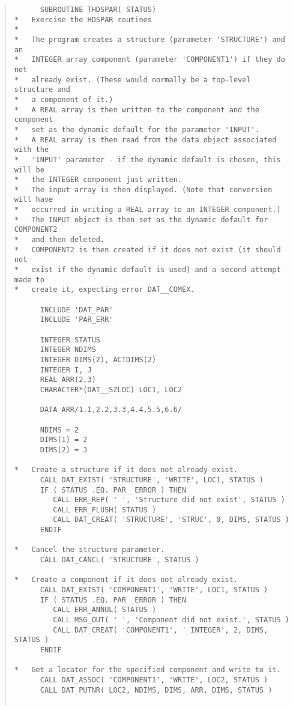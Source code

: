 \documentclass[twoside,11pt]{article}
\renewcommand{\_}{\texttt{\symbol{95}}}
\begin{document}
\begin{quote} \begin{verbatim}
      SUBROUTINE THDSPAR( STATUS)
*   Exercise the HDSPAR routines
*
*   The program creates a structure (parameter 'STRUCTURE') and an
*   INTEGER array component (parameter 'COMPONENT1') if they do not
*   already exist. (These would normally be a top-level structure and
*   a component of it.)
*   A REAL array is then written to the component and the component
*   set as the dynamic default for the parameter 'INPUT'.
*   A REAL array is then read from the data object associated with the
*   'INPUT' parameter - if the dynamic default is chosen, this will be
*   the INTEGER component just written.
*   The input array is then displayed. (Note that conversion will have
*   occurred in writing a REAL array to an INTEGER component.)
*   The INPUT object is then set as the dynamic default for COMPONENT2
*   and then deleted.
*   COMPONENT2 is then created if it does not exist (it should not
*   exist if the dynamic default is used) and a second attempt made to
*   create it, expecting error DAT__COMEX.

      INCLUDE 'DAT_PAR'
      INCLUDE 'PAR_ERR'

      INTEGER STATUS
      INTEGER NDIMS
      INTEGER DIMS(2), ACTDIMS(2)
      INTEGER I, J
      REAL ARR(2,3)
      CHARACTER*(DAT__SZLOC) LOC1, LOC2

      DATA ARR/1.1,2.2,3.3,4.4,5.5,6.6/

      NDIMS = 2
      DIMS(1) = 2
      DIMS(2) = 3

*   Create a structure if it does not already exist.
      CALL DAT_EXIST( 'STRUCTURE', 'WRITE', LOC1, STATUS )
      IF ( STATUS .EQ. PAR__ERROR ) THEN
         CALL ERR_REP( ' ', 'Structure did not exist', STATUS )
         CALL ERR_FLUSH( STATUS )
         CALL DAT_CREAT( 'STRUCTURE', 'STRUC', 0, DIMS, STATUS )
      ENDIF

*   Cancel the structure parameter.
      CALL DAT_CANCL( 'STRUCTURE', STATUS )

*   Create a component if it does not already exist.
      CALL DAT_EXIST( 'COMPONENT1', 'WRITE', LOC1, STATUS )
      IF ( STATUS .EQ. PAR__ERROR ) THEN
         CALL ERR_ANNUL( STATUS )
         CALL MSG_OUT( ' ', 'Component did not exist.', STATUS )
         CALL DAT_CREAT( 'COMPONENT1', '_INTEGER', 2, DIMS, STATUS )
      ENDIF

*   Get a locator for the specified component and write to it.
      CALL DAT_ASSOC( 'COMPONENT1', 'WRITE', LOC2, STATUS )
      CALL DAT_PUTNR( LOC2, NDIMS, DIMS, ARR, DIMS, STATUS )


\end{verbatim}
\end{quote}
\end{document}
